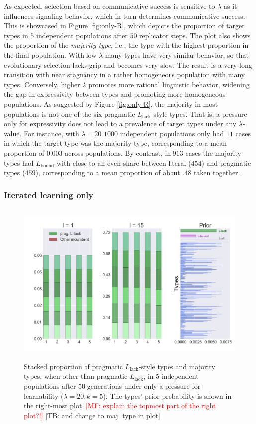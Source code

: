 \documentclass[a4paper, 11pt]{article}
\theoremstyle{Satz}
\newcommand{\mf}[1]{\textcolor{Red}{[MF: #1]}}
\newcommand{\tb}[1]{\textcolor[rgb]{.8,.33,.0}{[TB: #1]}}%
\newcommand{\mylang}[1]{\ensuremath{L_{\text{#1}}}\xspace} %
\newcommand{\Lbound}{\mylang{bound}}
\newcommand{\Llack}{\mylang{lack}}
\begin{document}
As expected, selection based on communicative success is sensitive to $\lambda$ as it
influences signaling behavior, which in turn determines communicative success. This is
showcased in Figure \ref{fig:only-R}, which depicts the proportion of target types in $5$
independent populations after $50$ replicator steps. The plot also shows the proportion of the
\emph{majority type}, i.e., the type with the highest proportion in the final population. With
low $\lambda$ many types have very similar behavior, so that evolutionary selection lacks grip
and becomes very slow. The result is a very long transition with near stagnancy in a rather
homogeneous population with many types. Conversely, higher $\lambda$ promotes more rational
linguistic behavior, widening the gap in expressivity between types and promoting more
homogeneous populations. As suggested by Figure \ref{fig:only-R}, the majority in most
populations is not one of the six pragmatic $\Llack$-style types. That is, a pressure only for
expressivity does not lead to a prevalence of target types under any $\lambda$-value. For
instance, with $\lambda = 20$ $1000$ independent populations only had $11$ cases in which
the target type was the majority type, corresponding to a mean proportion of $0.003$ across
populations. By contrast, in $913$ cases the majority types had $\Lbound$ with close to an even
share between literal ($454$) and pragmatic types ($459$), corresponding to a mean proportion
of about $.48$ taken together.


\subsubsection{Iterated learning only}

\begin{figure}[t]
\centering
\includegraphics[width=1\textwidth,height=8cm,keepaspectratio]{./plots/fig2-onlym-pr}
\caption{Stacked proportion of pragmatic $\Llack$-style types and majority types, when other
  than pragmatic $\Llack$, in $5$ independent populations after $50$ generations under only a
  pressure for learnability ($\lambda = 20, k = 5$). The types' prior probability is shown in
  the right-most plot. \mf{explain the topmost part of the right plot?!} \tb{and change to maj. type in plot}}
\label{fig:only-M}
\end{figure}
\end{document}
